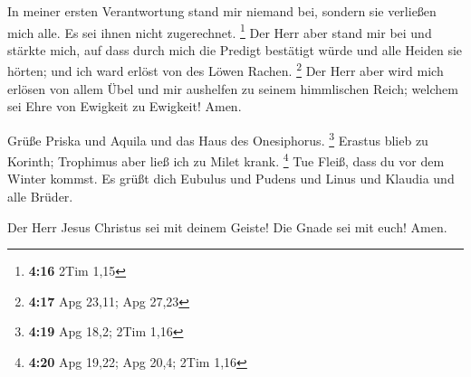  In meiner ersten Verantwortung stand mir niemand bei,
sondern sie verließen mich alle. Es sei ihnen nicht zugerechnet.
\footnote{\textbf{4:16} 2Tim 1,15}  Der Herr aber stand
mir bei und stärkte mich, auf dass durch mich die Predigt bestätigt
würde und alle Heiden sie hörten; und ich ward erlöst von des Löwen
Rachen. \footnote{\textbf{4:17} Apg 23,11; Apg 27,23} 
Der Herr aber wird mich erlösen von allem Übel und mir aushelfen zu
seinem himmlischen Reich; welchem sei Ehre von Ewigkeit zu Ewigkeit!
Amen.

 Grüße Priska und Aquila und das Haus des Onesiphorus.
\footnote{\textbf{4:19} Apg 18,2; 2Tim 1,16}  Erastus
blieb zu Korinth; Trophimus aber ließ ich zu Milet krank. \footnote{\textbf{4:20}
  Apg 19,22; Apg 20,4; 2Tim 1,16}  Tue Fleiß, dass du vor
dem Winter kommst. Es grüßt dich Eubulus und Pudens und Linus und
Klaudia und alle Brüder.

 Der Herr Jesus Christus sei mit deinem Geiste! Die Gnade
sei mit euch! Amen.
